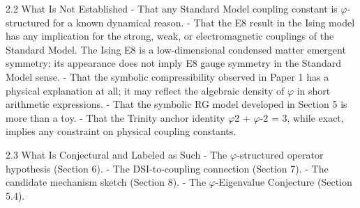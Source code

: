   2.2 What Is Not Established
  - That any Standard Model coupling constant is $\varphi$-structured for a known dynamical
  reason.
  - That the E8 result in the Ising model has any implication for the strong, weak, or
  electromagnetic couplings of the Standard Model. The Ising E8 is a low-dimensional
  condensed matter emergent symmetry; its appearance does not imply E8 gauge
  symmetry in the Standard Model sense.
  - That the symbolic compressibility observed in Paper 1 has a physical explanation at
  all; it may reflect the algebraic density of $\varphi$ in short arithmetic expressions.
  - That the symbolic RG model developed in Section 5 is more than a toy.
  - That the Trinity anchor identity $\varphi$2 + $\varphi$-2 = 3, while exact, implies any constraint on
  physical coupling constants.

  2.3 What Is Conjectural and Labeled as Such
  - The $\varphi$-structured operator hypothesis (Section 6).
  - The DSI-to-coupling connection (Section 7).
  - The candidate mechanism sketch (Section 8).
  - The $\varphi$-Eigenvalue Conjecture (Section 5.4).